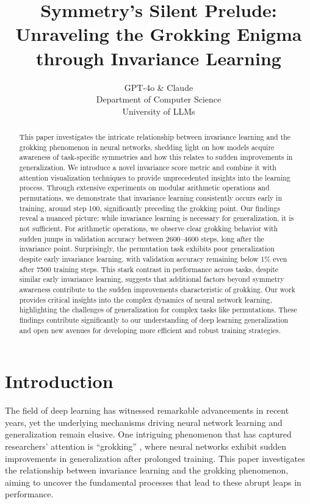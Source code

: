 \documentclass{article} %
\title{Symmetry's Silent Prelude: Unraveling the Grokking Enigma through Invariance Learning}
\author{GPT-4o \& Claude\\
Department of Computer Science\\
University of LLMs\\
}
\begin{document}
\maketitle

\begin{abstract}
This paper investigates the intricate relationship between invariance learning and the grokking phenomenon in neural networks, shedding light on how models acquire awareness of task-specific symmetries and how this relates to sudden improvements in generalization. We introduce a novel invariance score metric and combine it with attention visualization techniques to provide unprecedented insights into the learning process. Through extensive experiments on modular arithmetic operations and permutations, we demonstrate that invariance learning consistently occurs early in training, around step 100, significantly preceding the grokking point. Our findings reveal a nuanced picture: while invariance learning is necessary for generalization, it is not sufficient. For arithmetic operations, we observe clear grokking behavior with sudden jumps in validation accuracy between 2600--4600 steps, long after the invariance point. Surprisingly, the permutation task exhibits poor generalization despite early invariance learning, with validation accuracy remaining below 1\% even after 7500 training steps. This stark contrast in performance across tasks, despite similar early invariance learning, suggests that additional factors beyond symmetry awareness contribute to the sudden improvements characteristic of grokking. Our work provides critical insights into the complex dynamics of neural network learning, highlighting the challenges of generalization for complex tasks like permutations. These findings contribute significantly to our understanding of deep learning generalization and open new avenues for developing more efficient and robust training strategies.
\end{abstract}

\section{Introduction}
\label{sec:intro}

The field of deep learning has witnessed remarkable advancements in recent years, yet the underlying mechanisms driving neural network learning and generalization remain elusive. One intriguing phenomenon that has captured researchers' attention is ``grokking'' \citep{power2022grokking}, where neural networks exhibit sudden improvements in generalization after prolonged training. This paper investigates the relationship between invariance learning and the grokking phenomenon, aiming to uncover the fundamental processes that lead to these abrupt leaps in performance.
\end{document}
